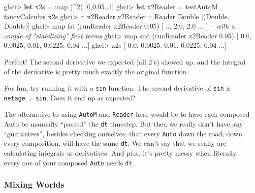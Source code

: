 \documentclass[]{article}
\newenvironment{Shaded}{}{}
\newcommand{\CommentTok}[1]{\textcolor[rgb]{0.38,0.63,0.69}{\textit{#1}}}
\newcommand{\DataTypeTok}[1]{\textcolor[rgb]{0.56,0.13,0.00}{#1}}
\newcommand{\DecValTok}[1]{\textcolor[rgb]{0.25,0.63,0.44}{#1}}
\newcommand{\FloatTok}[1]{\textcolor[rgb]{0.25,0.63,0.44}{#1}}
\newcommand{\FunctionTok}[1]{\textcolor[rgb]{0.02,0.16,0.49}{#1}}
\newcommand{\KeywordTok}[1]{\textcolor[rgb]{0.00,0.44,0.13}{\textbf{#1}}}
\newcommand{\NormalTok}[1]{#1}
\newcommand{\OtherTok}[1]{\textcolor[rgb]{0.00,0.44,0.13}{#1}}
\begin{document}
\begin{Shaded}
\begin{Highlighting}[]
\NormalTok{ghci}\FunctionTok{>} \KeywordTok{let}\NormalTok{ x2s }\FunctionTok{=}\NormalTok{ map (}\FunctionTok{^}\DecValTok{2}\NormalTok{) [}\DecValTok{0}\NormalTok{,}\FloatTok{0.05}\FunctionTok{..}\DecValTok{1}\NormalTok{]}
\NormalTok{ghci}\FunctionTok{>} \KeywordTok{let}\NormalTok{ x2Reader }\FunctionTok{=}\NormalTok{ testAutoM_ fancyCalculus x2s}
\NormalTok{ghci}\FunctionTok{>} \FunctionTok{:}\NormalTok{t x2Reader}
\OtherTok{x2Reader ::} \DataTypeTok{Reader} \DataTypeTok{Double}\NormalTok{ [(}\DataTypeTok{Double}\NormalTok{, }\DataTypeTok{Double}\NormalTok{)]}
\NormalTok{ghci}\FunctionTok{>}\NormalTok{ map fst (runReader x2Reader }\FloatTok{0.05}\NormalTok{)}
\NormalTok{[ }\FunctionTok{...} \FloatTok{2.0}\NormalTok{, }\FloatTok{2.0} \FunctionTok{...}\NormalTok{ ]    }\CommentTok{-- with a couple of "stabilizing" first terms}
\NormalTok{ghci}\FunctionTok{>}\NormalTok{ map snd (runReader x2Reader }\FloatTok{0.05}\NormalTok{)}
\NormalTok{[ }\FloatTok{0.0}\NormalTok{, }\FloatTok{0.0025}\NormalTok{, }\FloatTok{0.01}\NormalTok{, }\FloatTok{0.0225}\NormalTok{, }\FloatTok{0.04} \FunctionTok{...}\NormalTok{]}
\NormalTok{ghci}\FunctionTok{>}\NormalTok{ x2s}
\NormalTok{[ }\FloatTok{0.0}\NormalTok{, }\FloatTok{0.0025}\NormalTok{, }\FloatTok{0.01}\NormalTok{, }\FloatTok{0.0225}\NormalTok{, }\FloatTok{0.04} \FunctionTok{...}\NormalTok{]}
\end{Highlighting}
\end{Shaded}

Perfect! The second derivative we expected (all 2's) showed up, and the integral
of the derivative is pretty much exactly the original function.

For fun, try running it with a \texttt{sin} function. The second derivative of
\texttt{sin} is \texttt{netage\ .\ sin}. Does it end up as expected?

The alternative to using \texttt{AutoM} and \texttt{Reader} here would be to
have each composed Auto be manually ``passed'' the \texttt{dt} timestep. But
then we really don't have any ``guarantees'', besides checking ourselves, that
every \texttt{Auto} down the road, down every composition, will have the same
\texttt{dt}. We can't say that we really are calculating integrals or
derivatives. And plus, it's pretty messy when literally every one of your
composed \texttt{Auto} needs \texttt{dt}.

\hypertarget{mixing-worlds}{%
\subsubsection{Mixing Worlds}\label{mixing-worlds}}
\end{document}
